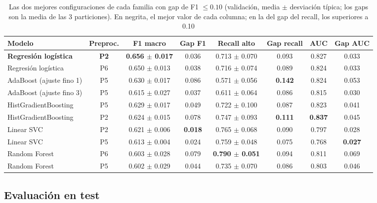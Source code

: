 \documentclass[journal,onecolumn]{IEEEtran}
\begin{document}
\begin{table}[!htb]
\caption{Las dos mejores configuraciones de cada familia con gap de F1 $\leq 0{.}10$ (validación, media $\pm$ desviación típica; los gaps son la media de las 3 particiones). En negrita, el mejor valor de cada columna; en la del gap del recall, los superiores a 0.10}
\label{tab:finalistas}
\centering
\small
\begin{tabular}{|l|c|c|c|c|c|c|c|}
\hline
\textbf{Modelo} & \textbf{Preproc.} & \textbf{F1 macro} & \textbf{Gap F1} & \textbf{Recall alto} & \textbf{Gap recall} & \textbf{AUC} & \textbf{Gap AUC} \\
\hline
\textbf{Regresión logística} & \textbf{P2} & \textbf{0.656 $\pm$ 0.017} & 0.036 & 0.713 $\pm$ 0.070 & 0.093 & 0.827 & 0.033 \\
Regresión logística & P6 & 0.650 $\pm$ 0.013 & 0.038 & 0.716 $\pm$ 0.074 & 0.089 & 0.824 & 0.033 \\
\hline
AdaBoost (ajuste fino 1) & P5 & 0.630 $\pm$ 0.017 & 0.086 & 0.571 $\pm$ 0.056 & \textbf{0.142} & 0.824 & 0.053 \\
AdaBoost (ajuste fino 3) & P5 & 0.615 $\pm$ 0.027 & 0.037 & 0.611 $\pm$ 0.064 & 0.086 & 0.815 & 0.030 \\
\hline
HistGradientBoosting & P5 & 0.629 $\pm$ 0.017 & 0.049 & 0.722 $\pm$ 0.100 & 0.087 & 0.823 & 0.041 \\
HistGradientBoosting & P2 & 0.624 $\pm$ 0.015 & 0.078 & 0.747 $\pm$ 0.093 & \textbf{0.111} & \textbf{0.837} & 0.045 \\
\hline
Linear SVC & P2 & 0.621 $\pm$ 0.006 & \textbf{0.018} & 0.765 $\pm$ 0.068 & 0.090 & 0.797 & 0.028 \\
Linear SVC & P5 & 0.613 $\pm$ 0.004 & 0.024 & 0.759 $\pm$ 0.048 & 0.075 & 0.768 & \textbf{0.027} \\
\hline
Random Forest & P6 & 0.603 $\pm$ 0.028 & 0.079 & \textbf{0.790 $\pm$ 0.051} & 0.094 & 0.811 & 0.069 \\
Random Forest & P5 & 0.602 $\pm$ 0.029 & 0.044 & 0.735 $\pm$ 0.070 & 0.086 & 0.803 & 0.046 \\
\hline
\end{tabular}
\end{table}

\subsection{Evaluación en test}
\end{document}
